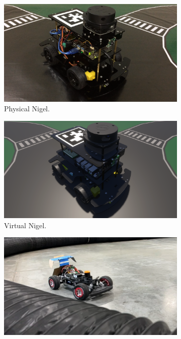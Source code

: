 \documentclass[letterpaper, 10 pt, conference]{ieeeconf}  %
\begin{document}
	\begin{figure}[t]
		\centering
		\begin{subfigure}[b]{0.245\linewidth}
			\centering
			\includegraphics[width=\linewidth]{Fig2a.png}
			\caption{Physical Nigel.}
			\label{fig2a}
		\end{subfigure}
		\hfill
		\begin{subfigure}[b]{0.245\linewidth}
			\centering
			\includegraphics[width=\linewidth]{Fig2b.png}
			\caption{Virtual Nigel.}
			\label{fig2b}
		\end{subfigure}
		\begin{subfigure}[b]{0.245\linewidth}
			\centering
			\includegraphics[width=\linewidth]{Fig2c.png}

\end{subfigure}
\end{figure}
\end{document}
